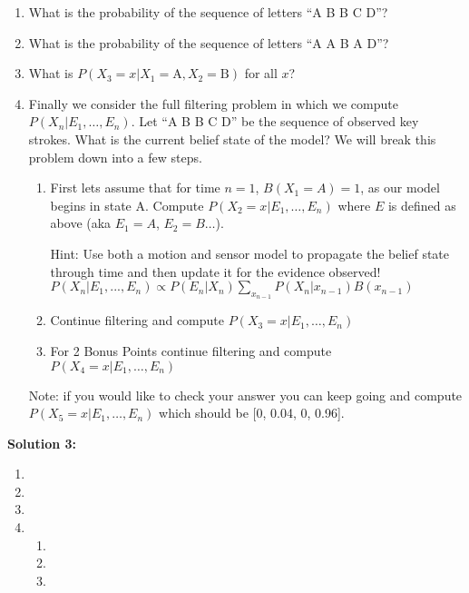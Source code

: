 \documentclass[]{article}
\begin{document}
\begin{enumerate}[label=(\alph*)]
    \item What is the probability of the sequence of letters ``A B B C D''? 
    
    \item What is the probability of the sequence of letters ``A A B A D''?
    
    \item What is $P(X_3=x | X_1 = \mathrm{A}, X_2 = \mathrm{B})$ for all $x$?
    
    \item Finally we consider the full filtering problem in which we compute $P(X_n | E_1, \ldots, E_n)$. Let ``A B B C D'' be the sequence of observed key strokes. What is the current belief state of the model? We will break this problem down into a few steps. 

    \begin{enumerate}[label=(\roman*)]
        \item First lets assume that for time $n=1$, $B(X_1 = A) = 1$, as our model begins in state A. Compute $P(X_2 = x | E_1, \ldots, E_n)$ where $E$ is defined as above (aka $E_1 = A$, $E_2 = B \dots$).

        Hint: Use both a motion and sensor model to propagate the belief state through time and then update it for the evidence observed! $P(X_n | E_1, ..., E_n) \propto P(E_n|X_n)\sum_{x_{n-1}}P(X_n|x_{n-1})B(x_{n-1})$
        
        \item Continue filtering and compute $P(X_3 = x | E_1, \ldots, E_n)$

        \item For 2 Bonus Points continue filtering and compute \\$P(X_4 = x | E_1, \ldots, E_n)$
    \end{enumerate}

    Note: if you would like to check your answer you can keep going and compute $P(X_5 = x | E_1, \ldots, E_n)$ which should be [0, 0.04, 0, 0.96].
    
\end{enumerate}

\textbf{Solution 3:}
\begin{enumerate}[label=(\alph*)]
    \item %
    \item %
    \item %
    \item \begin{enumerate}[label=(\roman*)]
            \item %
            \item %
            \item %
          \end{enumerate}
\end{enumerate}
\end{document}
